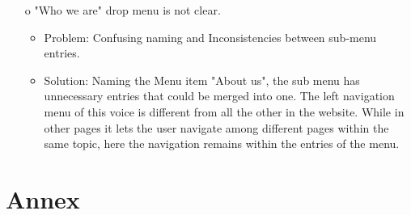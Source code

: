 \documentclass[11pt, letterpaper]{article}
\begin{document}
\begin{enumerate}
\begin{itemize}
        \end{itemize}
     \item[o] "Who we are" drop menu is not clear.
        \begin{itemize}
            \item Problem: Confusing naming and Inconsistencies between sub-menu entries.
            \item Solution: Naming the Menu item "About us", the sub menu has unnecessary entries that could be merged into one. 
            The left navigation menu of this voice is different from all the other in the website. While in other pages it lets the user navigate among different pages within the same topic, here the navigation remains within the entries of the menu.
        \end{itemize}
\end{enumerate}   

\newpage


\section{Annex}
\end{document}

